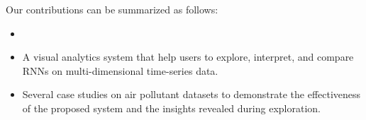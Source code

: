 Our contributions can be summarized as follows:
\begin{itemize}[noitemsep]
  \item {}
  \item A visual analytics system that help users to explore, interpret, and compare RNNs on multi-dimensional time-series data. 
  \item Several case studies on air pollutant datasets to demonstrate the effectiveness of the proposed system and the insights revealed during exploration.
\end{itemize}





